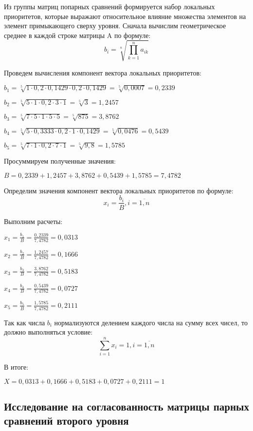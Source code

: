 Из группы матриц попарных сравнений формируется набор локальных приоритетов, которые выражают относительное влияние множества элементов на элемент примыкающего сверху уровня.
Сначала вычислим геометрическое среднее в каждой строке матрицы A по формуле:
\begin{equation}
b_i = \sqrt[n]{\prod_{k=1}^{n}a_{ik}}
\end{equation}

Проведем вычисления компонент вектора локальных приоритетов:

$b_1 = \sqrt[5]{1 \cdot 0,2 \cdot 0,1429 \cdot 0,2 \cdot 0,1429} = \sqrt[5]{0,0007} = 0,2339$

$b_2 = \sqrt[5]{5 \cdot 1 \cdot 0,2 \cdot 3 \cdot 1} = \sqrt[5]{3} = 1,2457$

$b_3 = \sqrt[5]{7 \cdot 5 \cdot 1 \cdot 5 \cdot 5} = \sqrt[5]{875} = 3,8762$

$b_4 = \sqrt[5]{5 \cdot 0,3333 \cdot 0,2 \cdot 1 \cdot 0,1429} = \sqrt[5]{0,0476} = 0,5439$

$b_5 = \sqrt[5]{7 \cdot 1 \cdot 0,2 \cdot 7 \cdot 1} = \sqrt[5]{9,8} = 1,5785$

Просуммируем полученные значения:

$B = 0,2339 + 1,2457 + 3,8762 + 0,5439 + 1,5785 = 7,4782$

Определим значения компонент вектора локальных приоритетов по формуле:
\begin{equation}
x_i = \frac{b_i}{B}, i = \overline{1,n}
\end{equation}

Выполним расчеты:

$x_1 = \frac{b_1}{B} =\frac{0,2339}{7,4782} = 0,0313$

$x_2 = \frac{b_2}{B} =\frac{1,2457}{7,4782} = 0,1666$

$x_3 = \frac{b_3}{B} =\frac{3,8762}{7,4782} = 0,5183$

$x_4 = \frac{b_4}{B} =\frac{0,5439}{7,4782} = 0,0727$

$x_5 = \frac{b_5}{B} =\frac{1,5785}{7,4782} = 0,2111$

Так как числа $b_i$ нормализуются делением каждого числа на сумму всех чисел, то должно выполняться условие:
\begin{equation}
\sum_{i=1}^{n} x_i = 1, i = \overline{1,n}
\end{equation}

В итоге:

$X = 0,0313 + 0,1666 + 0,5183 + 0,0727 + 0,2111 = 1$

\subsection{Исследование на согласованность матрицы парных сравнений второго уровня}

